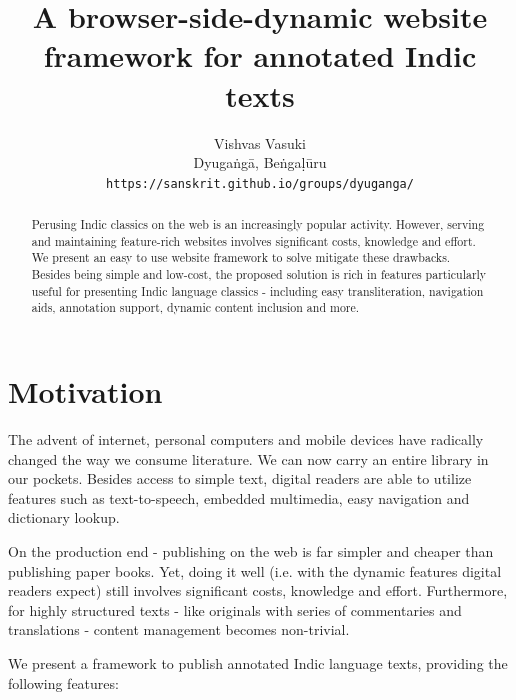 \documentclass[11pt]{article}
\title{A browser-side-dynamic website framework for annotated Indic texts}
\author{
  Vishvas Vasuki \\
  Dyugaṅgā, Beṅgaḷūru \\
  {\tt https://sanskrit.github.io/groups/dyuganga/}
\\}
\date{}
\begin{document}
\maketitle
\begin{abstract}
Perusing Indic classics on the web is an increasingly popular activity. However, serving and maintaining feature-rich websites involves significant costs, knowledge and effort. We present an easy to use website framework to solve mitigate these drawbacks. Besides being simple and low-cost, the proposed solution is rich in features particularly useful for presenting Indic language classics - including easy transliteration, navigation aids, annotation support, dynamic content inclusion and more.
\end{abstract}

\section{Motivation}
The advent of internet, personal computers and mobile devices have radically changed the way we consume literature. We can now carry an entire library in our pockets. Besides access to simple text, digital readers are able to utilize features such as text-to-speech, embedded multimedia, easy navigation and dictionary lookup. 

On the production end - publishing on the web is far simpler and cheaper than publishing paper books. Yet, doing it well (i.e. with the dynamic features digital readers expect) still involves significant costs, knowledge and effort. Furthermore, for highly structured texts - like originals with series of commentaries and translations - content management becomes non-trivial.

We present a framework to publish annotated Indic language texts, providing the following features:
\end{document}
